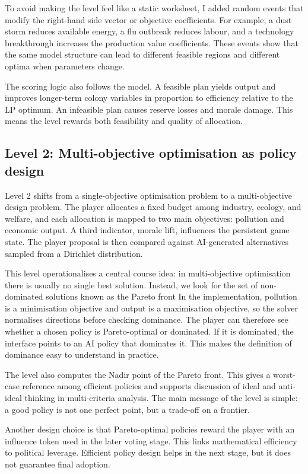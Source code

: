 To avoid making the level feel like a static worksheet, I added random
events that modify the right-hand side vector or objective coefficients.
For example, a dust storm reduces available energy, a flu outbreak
reduces labour, and a technology breakthrough increases the production
value coefficients. These events show that the same model structure can
lead to different feasible regions and different optima when parameters
change.

The scoring logic also follows the model. A feasible plan yields output
and improves longer-term colony variables in proportion to efficiency
relative to the LP optimum. An infeasible plan causes reserve losses and
morale damage. This means the level rewards both feasibility and quality
of allocation.

\subsection{Level 2: Multi-objective optimisation as policy design}

Level 2 shifts from a single-objective optimisation problem to a
multi-objective design problem. The player allocates a fixed budget
among industry, ecology, and welfare, and each allocation is mapped to
two main objectives: pollution and economic output. A third indicator,
morale lift, influences the persistent game state. The player proposal
is then compared against AI-generated alternatives sampled from a
Dirichlet distribution.

This level operationalises a central course idea: in multi-objective
optimisation there is usually no single best solution. Instead, we look
for the set of non-dominated solutions known as the Pareto front
In the implementation, pollution is a
minimisation objective and output is a maximisation objective, so the
solver normalises directions before checking dominance. The player can
therefore see whether a chosen policy is Pareto-optimal or dominated.
If it is dominated, the interface points to an AI policy that dominates
it. This makes the definition of dominance easy to understand in
practice.

The level also computes the Nadir point of the Pareto front. This gives
a worst-case reference among efficient policies and supports discussion
of ideal and anti-ideal thinking in multi-criteria analysis. The main
message of the level is simple: a good policy is not one perfect point,
but a trade-off on a frontier.

Another design choice is that Pareto-optimal policies reward the player
with an influence token used in the later voting stage. This links
mathematical efficiency to political leverage. Efficient policy design
helps in the next stage, but it does not guarantee final adoption.

